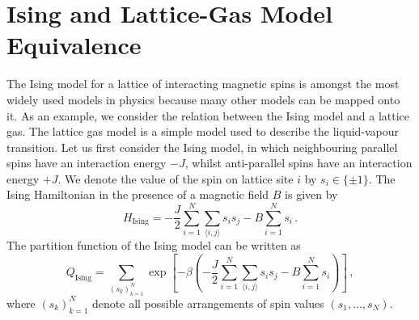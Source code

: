 \documentclass{article}
\theoremstyle{plain}\theoremheaderfont{\normalfont\bfseries}\theorembodyfont{\rmfamily}\theoremseparator{.}\newtheorem*{thm}{Theorem}\newtheorem*{law}{Law}\newtheorem*{pos}{Postulate}
\numberwithin{equation}{section}
\begin{document}
    \section{Ising and Lattice-Gas Model Equivalence}\label{Chap:Ising_Lattice_Gas}
    The Ising model for a lattice of interacting magnetic spins is amongst the most widely used models in physics because many other models can be mapped onto it. As an example, we consider the relation between the Ising model and a lattice gas. The lattice gas model is a simple model used to describe the liquid-vapour transition. Let us first consider the Ising model, in which neighbouring parallel spins have an interaction energy \(-J\), whilst anti-parallel spins have an interaction energy \(+J\). We denote the value of the spin on lattice site \(i\) by \(s_i\in\{\pm 1\}\). The Ising Hamiltonian in the presence of a magnetic field \(B\) is given by
    \begin{equation}
        H_{\text{Ising}}=-\frac{J}{2}\sum_{i=1}^{N}\sum_{\langle i,j\rangle}s_is_j-B\sum_{i=1}^{N}s_i\,.
    \end{equation}
    The partition function of the Ising model can be written as
    \begin{equation}\label{Q_ising}
        Q_{\text{Ising}}=\sum_{(s_k)_{k=1}^{N}}\exp\left[-\beta\left(-\frac{J}{2}\sum_{i=1}^{N}\sum_{\langle i,j\rangle}s_is_j-B\sum_{i=1}^{N}s_i\right)\right]\,,
    \end{equation}
    where \((s_k)_{k=1}^{N}\) denote all possible arrangements of spin values \((s_1,\dots,s_N)\).
\end{document}
